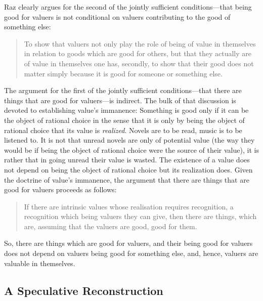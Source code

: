 \documentclass[12pt]{article}
\begin{document}
Raz clearly argues for the second of the jointly sufficient conditions---that being good for valuers is not conditional on valuers contributing to the good of something else:
\begin{quote}
	To show that valuers not only play the role of being of value in themselves in relation to goods which are good for others, but that they actually are of value in themselves one has, secondly, to show that their good does not matter simply because it is good for someone or something else. \citep[156]{Raz:2001ps}
\end{quote}

The argument for the first of the jointly sufficient conditions---that there are things that are good for valuers---is indirect. The bulk of that discussion is devoted to establishing value's immanence: Something is good only if it can be the object of rational choice in the sense that it is only by being the object of rational choice that its value is \emph{realized}. Novels are to be read, music is to be listened to. It is not that unread novels are only of potential value (the way they would be if being the object of rational choice were the source of their value), it is rather that in going unread their value is wasted. The existence of a value does not depend on being the object of rational choice but its realization does. Given the doctrine of value's immanence, the argument that there are things that are good for valuers proceeds as follows:
\begin{quote}
	If there are intrinsic values whose realisation requires recognition, a recognition which being valuers they can give, then there are things, which are, assuming that the valuers are good, good for them. \citep[156]{Raz:2001ps}
\end{quote}

So, there are things which are good for valuers, and their being good for valuers does not depend on valuers being good for something else, and, hence, valuers are valuable in themselves.


\subsection{A Speculative Reconstruction}\label{sub:a_speculative_reconstruction} %
\end{document}
